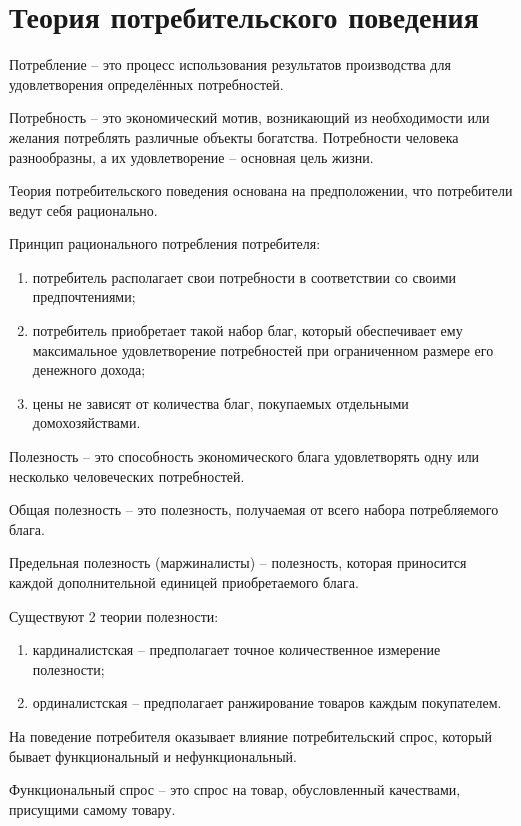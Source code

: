\section{Теория потребительского поведения}
Потребление -- это процесс использования результатов производства для
удовлетворения определённых потребностей.

Потребность -- это экономический мотив, возникающий из необходимости или желания
потреблять различные объекты богатства. Потребности человека разнообразны, а их
удовлетворение -- основная цель жизни.

Теория потребительского поведения основана на предположении, что потребители
ведут себя рационально.

Принцип рационального потребления потребителя:
\begin{enumerate}
    \item потребитель располагает свои потребности в соответствии со своими
        предпочтениями;
    \item потребитель приобретает такой набор благ, который обеспечивает ему
        максимальное удовлетворение потребностей при ограниченном размере его
        денежного дохода;
    \item цены не зависят от количества благ, покупаемых отдельными
        домохозяйствами.
\end{enumerate}

Полезность -- это способность экономического блага удовлетворять одну или
несколько человеческих потребностей.

Общая полезность -- это полезность, получаемая от всего набора потребляемого
блага.

Предельная полезность (маржиналисты) -- полезность, которая приносится каждой
дополнительной единицей приобретаемого блага.

Существуют 2 теории полезности:
\begin{enumerate}
    \item кардиналистская -- предполагает точное количественное измерение
        полезности;
    \item ординалистская -- предполагает ранжирование товаров каждым
        покупателем.
\end{enumerate}

На поведение потребителя оказывает влияние потребительский спрос, который бывает функциональный и нефункциональный.

Функциональный спрос -- это спрос на товар, обусловленный качествами, присущими
самому товару.

